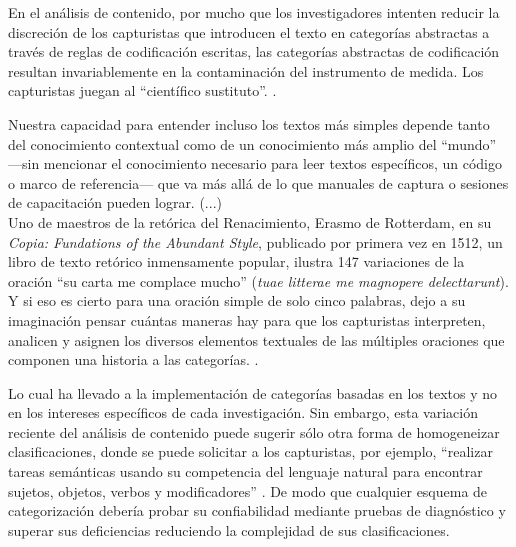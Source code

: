 \documentclass[letterpaper, 11pt]{book}
\theoremstyle{definition}
\theoremstyle{remark}
\begin{document}
\begin{center}
    \begin{minipage}{0.9\linewidth}
        {\setlength{\parindent}{12pt}\small
        En el análisis de contenido, por mucho que los investigadores intenten reducir la discreción de los capturistas que introducen el texto en categorías abstractas a través de reglas de codificación escritas, las categorías abstractas de codificación resultan invariablemente en la contaminación del instrumento de medida. Los capturistas juegan al ``científico sustituto''. \normalsize \citep[36]{2010_Franzosi_QNA}.
        }
    \end{minipage}
\end{center}


\begin{center}
    \begin{minipage}{0.9\linewidth}
        {\setlength{\parindent}{12pt}\small
        Nuestra capacidad para entender incluso los textos más simples depende tanto del conocimiento contextual como de un conocimiento más amplio del ``mundo'' ---sin mencionar el conocimiento necesario para leer textos específicos, un código o marco de referencia--- que va más allá de lo que manuales de captura o sesiones de capacitación pueden lograr. (...)
        \\
        
        Uno de maestros de la retórica del Renacimiento,  Erasmo de Rotterdam, en su \emph{Copia: Fundations of the Abundant Style}, publicado por primera vez en 1512, un libro de texto retórico inmensamente popular, ilustra 147 variaciones de la oración ``su carta me complace mucho'' (\emph{tuae litterae me magnopere delecttarunt}). 
        Y si eso es cierto para una oración simple de solo cinco palabras, dejo a su imaginación pensar cuántas maneras hay para que los capturistas interpreten, analicen y asignen los diversos elementos textuales de las múltiples oraciones que componen una historia a las categorías. \normalsize \citep[148]{2010_Franzosi_QNA}.
        }
    \end{minipage}
\end{center}

Lo cual ha llevado a la implementación de categorías basadas en los textos y no en los intereses específicos de cada investigación. 
Sin embargo, esta variación reciente del análisis de contenido puede sugerir sólo otra forma de homogeneizar clasificaciones, donde se puede solicitar a los capturistas, por ejemplo, ``realizar tareas semánticas usando su competencia del lenguaje natural para encontrar sujetos, objetos, verbos y modificadores'' \citet[158]{2003_Wada_Tesis}. 
De modo que cualquier esquema de categorización debería probar su confiabilidad mediante pruebas de diagnóstico y superar sus deficiencias reduciendo la complejidad de sus clasificaciones.
\end{document}
